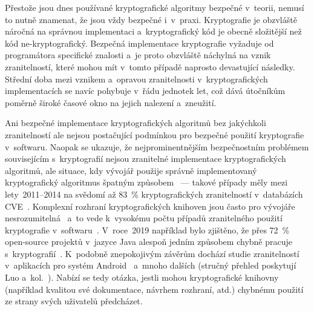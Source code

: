 \label{pouziti}

Přestože jsou dnes používané kryptografické algoritmy bezpečné v~teorii, nemusí to nutně znamenat, že jsou vždy bezpečné i~v~praxi. Kryptografie je obzvláště náročná na správnou implementaci a~kryptografický kód je obecně složitější než kód ne-kryptografický. Bezpečná implementace kryptografie vyžaduje od programátora specifické znalosti a~je proto obzvláště náchylná na vznik zranitelností, které mohou mít v~tomto případě naprosto devastující následky. Střední doba mezi vznikem a~opravou zranitelnosti v~kryptografických implementacích se navíc pohybuje v~řádu jednotek let, což dává útočníkům poměrně široké časové okno na jejich nalezení a~zneužití.~\cite{youreallyshouldnt}

Ani bezpečné implementace kryptografických algoritmů bez jakýchkoli zranitelností ale nejsou postačující podmínkou pro bezpečné použití kryptografie v~softwaru. Naopak se ukazuje, že nejprominentnějším bezpečnostním problémem souvisejícím s~kryptografií nejsou zranitelné implementace kryptografických algoritmů, ale situace, kdy vývojář použije správně implementovaný kryptografický algoritmus špatným způsobem~\cite{das2014iv} --- takové případy měly mezi lety~2011--2014 na svědomí až 83~\% kryptografických zranitelností v~databázích CVE~\cite{lazaretal}. Komplexní rozhraní kryptografických knihoven jsou často pro vývojáře nesrozumitelná~\cite{hurdles} a~to vede k~vysokému počtu případů zranitelného použití kryptografie v~softwaru~\cite{comparative2023}. V~roce~2019 například bylo zjištěno, že přes 72~\% open-source projektů v~jazyce Java alespoň jedním způsobem chybně pracuje s~kryptografií~\cite{javacrypto}. K~podobně znepokojivým závěrům dochází studie zranitelností v~aplikacích pro systém Android~\cite{egele-android} a~mnoho dalších (stručný přehled poskytují Luo a~kol.~\cite{comparative2023}). Nabízí se tedy otázka, jestli mohou kryptografické knihovny (například kvalitou své dokumentace, návrhem rozhraní, atd.) chybnému použití ze strany svých uživatelů předcházet.

